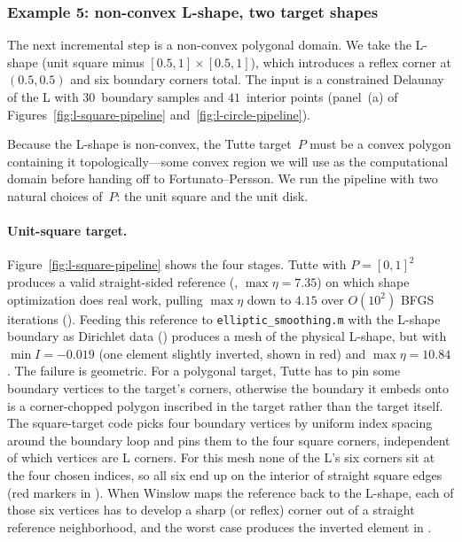 \documentclass[11pt]{article}
\begin{document}
\subsubsection{Example 5: non-convex L-shape, two target shapes}
\label{sec:tutte-ex-lshape}

The next incremental step is a non-convex polygonal domain. We take
the L-shape (unit square minus $[0.5,1] \times [0.5,1]$), which
introduces a reflex corner at $(0.5,0.5)$ and six boundary corners
total. The input is a constrained Delaunay of the L with
$30$~boundary samples and $41$~interior points
(panel~(a) of Figures~\ref{fig:l-square-pipeline}
and~\ref{fig:l-circle-pipeline}).

Because the L-shape is non-convex, the Tutte target~$P$ must be a
convex polygon containing it topologically---some convex region we
will use as the computational domain before handing off to
Fortunato--Persson. We run the pipeline with two natural choices
of~$P$: the unit square and the unit disk.

\paragraph{Unit-square target.}
Figure~\ref{fig:l-square-pipeline} shows the four stages. Tutte
with $P = [0,1]^2$ produces a valid straight-sided reference
(, $\max \eta = 7.35$) on which shape
optimization does real work, pulling $\max \eta$ down to $4.15$
over $O(10^2)$ BFGS iterations
(). Feeding this reference to
\texttt{elliptic\_smoothing.m} with the L-shape boundary as
Dirichlet data
() produces a mesh of the physical
L-shape, but with $\min I = -0.019$ (one element slightly
inverted, shown in red) and $\max \eta = 10.84$. The failure is
geometric. For a polygonal target, Tutte has to pin some
boundary vertices to the target's corners, otherwise the
boundary it embeds onto is a corner-chopped polygon inscribed in
the target rather than the target itself. The square-target code
picks four boundary vertices by uniform index spacing around the
boundary loop and pins them to the four square corners,
independent of which vertices are L corners. For this mesh none
of the L's six corners sit at the four chosen indices, so all six
end up on the interior of straight square edges (red markers in
). When Winslow maps the reference back to
the L-shape, each of those six vertices has to develop a sharp
(or reflex) corner out of a straight reference neighborhood, and
the worst case produces the inverted element in
.
\end{document}
